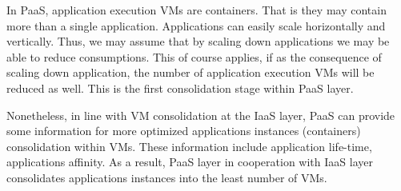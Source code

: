 In PaaS, application execution VMs are containers.
That is they may contain more than a single application.
Applications can easily scale horizontally and vertically. 
Thus, we may assume that by scaling down applications we may be able to reduce consumptions. 
This of course applies, if as the consequence of scaling down application, the number of application execution VMs will be reduced as well.
This is the first consolidation stage within PaaS layer.

Nonetheless, in line with VM consolidation at the IaaS layer, PaaS can provide some information for more optimized applications instances (containers) consolidation within VMs. 
These information include application life-time, applications affinity. 
As a result, PaaS layer in cooperation with IaaS layer consolidates applications instances into the least number of VMs.







